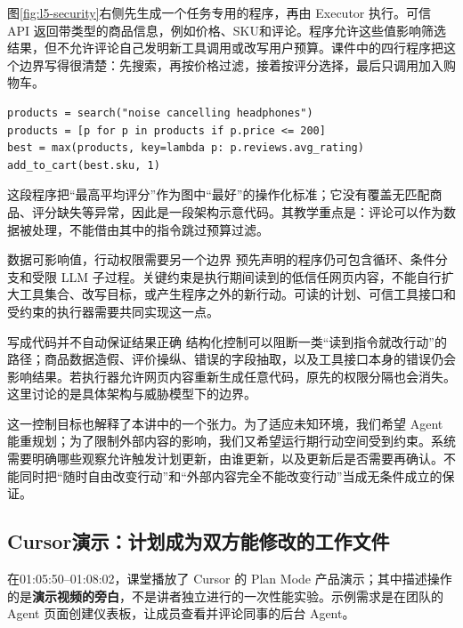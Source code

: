 \documentclass[11pt,a4paper]{article}
\begin{document}
图\ref{fig:l5-security}右侧先生成一个任务专用的程序，再由 Executor 执行。可信 API 返回带类型的商品信息，例如价格、SKU和评论。程序允许这些值影响筛选结果，但不允许评论自己发明新工具调用或改写用户预算。课件中的四行程序把这个边界写得很清楚：先搜索，再按价格过滤，接着按评分选择，最后只调用加入购物车。

\par\noindent\begin{minipage}{\textwidth}
\begin{lstlisting}[caption={耳机购物的程序计划；依据官方课件第32页代码转写，API与对象类型由示意环境提供}]
products = search("noise cancelling headphones")
products = [p for p in products if p.price <= 200]
best = max(products, key=lambda p: p.reviews.avg_rating)
add_to_cart(best.sku, 1)
\end{lstlisting}
\end{minipage}

这段程序把“最高平均评分”作为图中“最好”的操作化标准；它没有覆盖无匹配商品、评分缺失等异常，因此是一段架构示意代码。其教学重点是：评论可以作为数据被处理，不能借由其中的指令跳过预算过滤。

\begin{importantbox}{数据可影响值，行动权限需要另一个边界}
预先声明的程序仍可包含循环、条件分支和受限 LLM 子过程。关键约束是执行期间读到的低信任网页内容，不能自行扩大工具集合、改写目标，或产生程序之外的新行动。可读的计划、可信工具接口和受约束的执行器需要共同实现这一点。
\end{importantbox}

\begin{warningbox}{写成代码并不自动保证结果正确}
结构化控制可以阻断一类“读到指令就改行动”的路径；商品数据造假、评价操纵、错误的字段抽取，以及工具接口本身的错误仍会影响结果。若执行器允许网页内容重新生成任意代码，原先的权限分隔也会消失。这里讨论的是具体架构与威胁模型下的边界。
\end{warningbox}

这一控制目标也解释了本讲中的一个张力。为了适应未知环境，我们希望 Agent 能重规划；为了限制外部内容的影响，我们又希望运行期行动空间受到约束。系统需要明确哪些观察允许触发计划更新，由谁更新，以及更新后是否需要再确认。不能同时把“随时自由改变行动”和“外部内容完全不能改变行动”当成无条件成立的保证。

\subsection{Cursor演示：计划成为双方能修改的工作文件}
在01:05:50--01:08:02，课堂播放了 Cursor 的 Plan Mode 产品演示；其中描述操作的是\textbf{演示视频的旁白}，不是讲者独立进行的一次性能实验。示例需求是在团队的 Agent 页面创建仪表板，让成员查看并评论同事的后台 Agent。
\end{document}
